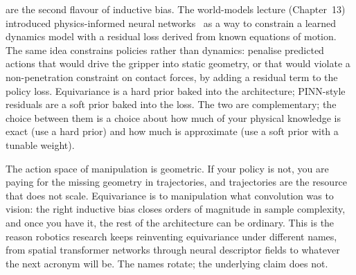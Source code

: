  are the second flavour of inductive bias. The world-models lecture (Chapter~13) introduced physics-informed neural networks~\cite{Raissi2019PINN} as a way to constrain a learned dynamics model with a residual loss derived from known equations of motion. The same idea constrains policies rather than dynamics: penalise predicted actions that would drive the gripper into static geometry, or that would violate a non-penetration constraint on contact forces, by adding a residual term to the policy loss. Equivariance is a hard prior baked into the architecture; PINN-style residuals are a soft prior baked into the loss. The two are complementary; the choice between them is a choice about how much of your physical knowledge is exact (use a hard prior) and how much is approximate (use a soft prior with a tunable weight).

 The action space of manipulation is geometric. If your policy is not, you are paying for the missing geometry in trajectories, and trajectories are the resource that does not scale. Equivariance is to manipulation what convolution was to vision: the right inductive bias closes orders of magnitude in sample complexity, and once you have it, the rest of the architecture can be ordinary. This is the reason robotics research keeps reinventing equivariance under different names, from spatial transformer networks through neural descriptor fields to whatever the next acronym will be. The names rotate; the underlying claim does not.

\begin{marginfigure}
\caption{Equivariance as a commuting square. Apply the group action then the policy, or the policy then the group action; the answers agree.}
\label{fig:equivariance_square}
\end{marginfigure}

